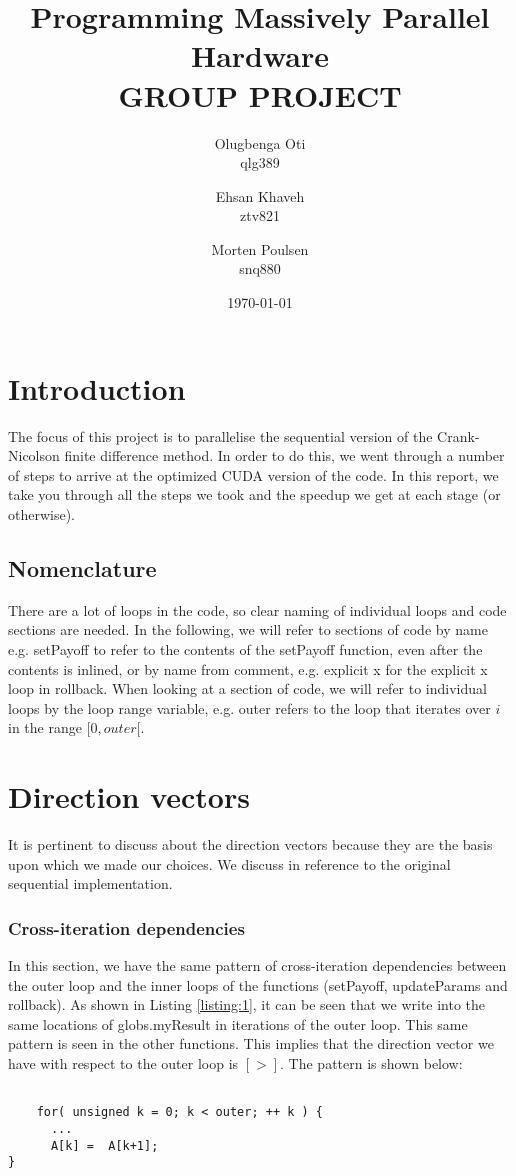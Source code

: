\documentclass{article}
\title{Programming Massively Parallel Hardware \\ GROUP PROJECT}
\author{Olugbenga Oti \\ qlg389 
   \and Ehsan Khaveh \\ ztv821
   \and Morten Poulsen \\ snq880 }
\date{\today}
\begin{document}
\maketitle
\section*{Introduction}
The focus of this project is to parallelise the sequential version of the Crank-Nicolson finite difference method. In order to do this, we went through a number of steps to arrive at the optimized CUDA version of the code. In this report, we take you through all the steps we took and the speedup we get at each stage (or otherwise).

\subsection*{Nomenclature}
There are a lot of loops in the code, so clear naming of individual loops and code sections are needed. In the following, we will refer to sections of code by name e.g. setPayoff to refer to the contents of the setPayoff function, even after the contents is inlined, or by name from comment, e.g. explicit x for the explicit x loop in rollback. When looking at a section of code, we will refer to individual loops by the loop range variable, e.g. outer refers to the loop that iterates over $i$ in the range $[0,outer[$.

\section*{Direction vectors}
It is pertinent to discuss about the direction vectors because they are the basis upon which we made our choices. We discuss in reference to the original sequential implementation.   
\subsubsection*{Cross-iteration dependencies}
In this section, we have the same pattern of cross-iteration dependencies between the outer loop and the inner loops of the functions (setPayoff, updateParams and rollback). As shown in Listing \ref{listing:1}, it can be seen that we write into the same locations of globs.myResult in iterations of the outer loop. This same pattern is seen in the other functions. This implies that the direction vector we have with respect to the outer loop is $[>]$.
The pattern is shown below:

\begin{verbatim}
    
    for( unsigned k = 0; k < outer; ++ k ) { 
      ...
      A[k] =  A[k+1];
}
\end{verbatim}
\end{document}
